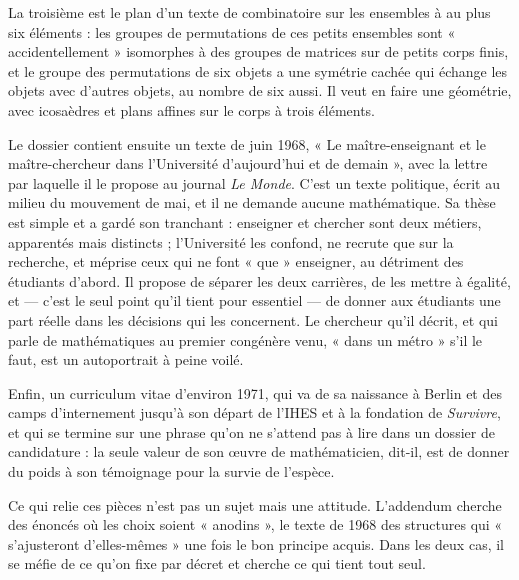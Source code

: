 \documentclass[11pt,a4paper]{article}
\begin{document}
\begin{resume}
La troisième est le plan d'un texte de combinatoire sur les ensembles à au
plus six éléments : les groupes de permutations de ces petits ensembles sont
« accidentellement » isomorphes à des groupes de matrices sur de petits corps
finis, et le groupe des permutations de six objets a une symétrie cachée qui
échange les objets avec d'autres objets, au nombre de six aussi. Il veut en
faire une géométrie, avec icosaèdres et plans affines sur le corps à trois
éléments.

Le dossier contient ensuite un texte de juin 1968, « Le maître-enseignant et
le maître-chercheur dans l'Université d'aujourd'hui et de demain », avec la
lettre par laquelle il le propose au journal \emph{Le Monde}. C'est un texte
politique, écrit au milieu du mouvement de mai, et il ne demande aucune
mathématique. Sa thèse est simple et a gardé son tranchant : enseigner et
chercher sont deux métiers, apparentés mais distincts ; l'Université les
confond, ne recrute que sur la recherche, et méprise ceux qui ne font
« que » enseigner, au détriment des étudiants d'abord. Il propose de séparer
les deux carrières, de les mettre à égalité, et — c'est le seul point qu'il
tient pour essentiel — de donner aux étudiants une part réelle dans les
décisions qui les concernent. Le chercheur qu'il décrit, et qui parle de
mathématiques au premier congénère venu, « dans un métro » s'il le faut, est
un autoportrait à peine voilé.

Enfin, un curriculum vitae d'environ 1971, qui va de sa naissance à Berlin
et des camps d'internement jusqu'à son départ de l'IHES et à la fondation de
\emph{Survivre}, et qui se termine sur une phrase qu'on ne s'attend pas à
lire dans un dossier de candidature : la seule valeur de son œuvre de
mathématicien, dit-il, est de donner du poids à son témoignage pour la survie
de l'espèce.

Ce qui relie ces pièces n'est pas un sujet mais une attitude. L'addendum
cherche des énoncés où les choix soient « anodins », le texte de 1968 des
structures qui « s'ajusteront d'elles-mêmes » une fois le bon principe acquis.
Dans les deux cas, il se méfie de ce qu'on fixe par décret et cherche ce qui
tient tout seul.

\end{resume}
\end{document}
